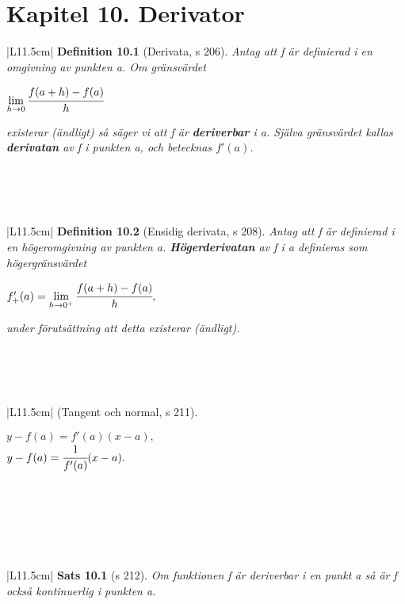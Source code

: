 \documentclass[a4paper]{article}
\begin{document}
\section*{Kapitel 10. Derivator}
\begin{tabular}{|L{11.5cm}|} \hline
\textbf{Definition 10.1} (Derivata, s 206). 
\textit{Antag att f är definierad i en omgivning av punkten a. Om gränsvärdet}
\begin{center}
$\lim\limits_{h\rightarrow 0} \cfrac{f(a+h)-f(a)}{h}$
\end{center}
\textit{existerar (ändligt) så säger vi att f är \textbf{deriverbar} i a. Själva gränsvärdet kallas \textbf{derivatan} av f i punkten a, och betecknas $f'(a)$.}
\\\hline
\end{tabular}
\\\\\\
\begin{tabular}{|L{11.5cm}|} \hline
\textbf{Definition 10.2} (Ensidig derivata, s 208). 
\textit{Antag att f är definierad i en högeromgivning av punkten a. \textbf{Högerderivatan} av f i a definieras som högergränsvärdet}
\begin{center}
$f'_+(a) = \lim\limits_{h\rightarrow 0^+}\cfrac{f(a+h)-f(a)}{h},$
\end{center}
\textit{under förutsättning att detta existerar (ändligt).}
\\\hline
\end{tabular}
\\\\\\
\begin{tabular}{|L{11.5cm}|} \hline
(Tangent och normal, s 211). 
\begin{center}
$y-f(a) =f'(a)(x-a),$ \\
$y-f(a) =\cfrac{1}{f'(a)}(x-a).$
\end{center}
\\\hline
\end{tabular}
\\\\\\
\begin{tabular}{|L{11.5cm}|} \hline
\textbf{Sats 10.1} (s 212).
\textit{Om funktionen f är deriverbar i en punkt a så är f också kontinuerlig i punkten a.}
\\\hline
\end{tabular}
\\\\\\
\end{document}
